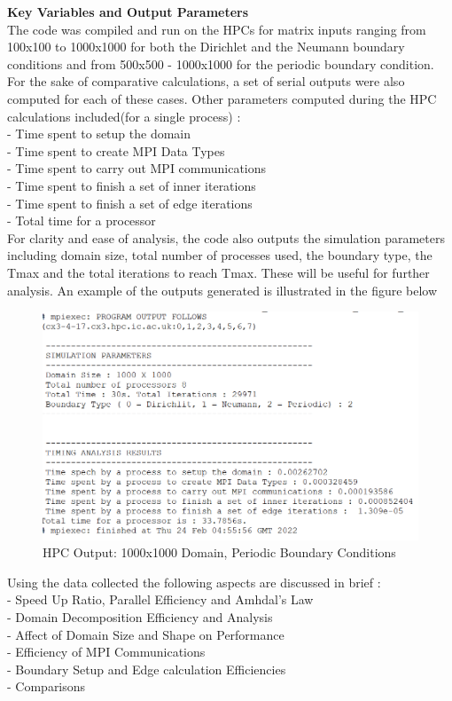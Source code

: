 \documentclass[twoside,twocolumn]{article}
\begin{document}
\textbf{Key Variables and Output Parameters} \\
The code was compiled and run on the HPCs for matrix inputs ranging from 100x100 to 1000x1000 for both the Dirichlet and the Neumann boundary conditions and from 500x500 - 1000x1000 for the periodic boundary condition. For the sake of comparative calculations, a set of serial outputs were also computed for each of these cases. Other parameters computed during the HPC calculations included(for a single process) :  \\
- Time spent to setup the domain \\
- Time spent to create MPI Data Types\\
- Time spent  to carry out MPI communications \\
- Time spent  to finish a set of inner iterations\\
- Time spent  to finish a set of edge iterations\\
- Total time for a processor \\
For clarity and ease of analysis, the code also outputs the simulation parameters including domain size, total number of processes used, the boundary type, the Tmax and the total iterations to reach Tmax. These will be useful for further analysis. An example of the outputs generated is illustrated in the figure below
\vspace{-4mm}
\begin{figure}[h]
\centering
\includegraphics[height=5.5 cm\textwidth]{images/hpcoutput.png}
\caption{HPC Output: 1000x1000 Domain, Periodic Boundary Conditions}
\end{figure}

Using the data collected the following aspects are discussed in brief :\\
 - Speed Up Ratio, Parallel Efficiency and Amhdal's Law\\
 - Domain Decomposition Efficiency and Analysis\\
 - Affect of Domain Size and Shape on Performance\\
 - Efficiency of MPI Communications \\
 - Boundary Setup and Edge calculation Efficiencies \\
 - Comparisons
\end{document}

